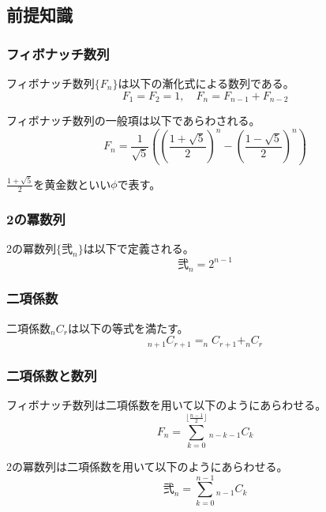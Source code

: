 \documentclass[dvipdfmx,12pt]{beamer}
\begin{document}
\subsection{前提知識}

\begin{frame}
\frametitle{フィボナッチ数列}
\begin{definition}
フィボナッチ数列$\{F_n\}$は以下の漸化式による数列である。
$$
F_1=F_2=1,\quad F_{n}=F_{n-1}+F_{n-2}
$$
\end{definition}
\begin{theorem}[ビネーの公式]
フィボナッチ数列の一般項は以下であらわされる。
$$
F_n=\frac{1}{\sqrt{5}}\left(\left(\frac{1+\sqrt{5}}{2}\right)^n-\left(\frac{1-\sqrt{5}}{2}\right)^n\right)
$$
\end{theorem}
$\frac{1+\sqrt{5}}{2}$を黄金数といい$\phi$で表す。
\end{frame}

\begin{frame}
\frametitle{2の冪数列}
\begin{definition}
2の冪数列$\{\mbox{弐}_n\}$は以下で定義される。
$$
\mbox{弐}_n=2^{n-1}
$$
\end{definition}
\end{frame}

\begin{frame}
\frametitle{二項係数}
\begin{theorem}
二項係数$_nC_r$は以下の等式を満たす。
\[_{n+1}C_{r+1}=_nC_{r+1}+_nC_r\]
\end{theorem}
\end{frame}

\begin{frame}
\frametitle{二項係数と数列}
\begin{theorem}
フィボナッチ数列は二項係数を用いて以下のようにあらわせる。
$$
F_n=\sum_{k=0}^{\lfloor \frac{n-1}{2} \rfloor}{_{n-k-1}C_k}
$$
\end{theorem}
\begin{theorem}
2の冪数列は二項係数を用いて以下のようにあらわせる。
$$
\mbox{弐}_n=\sum_{k=0}^{n-1}{_{n-1}C_k}
$$
\end{theorem}
\end{frame}
\end{document}
